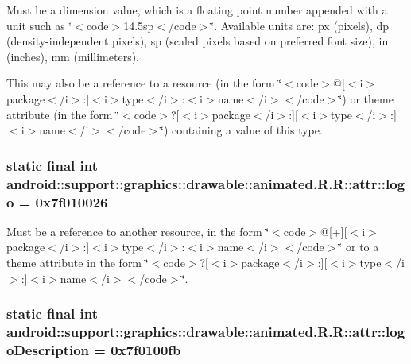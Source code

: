 Must be a dimension value, which is a floating point number appended with a unit such as \char`\"{}$<$code$>$14.5sp$<$/code$>$\char`\"{}. Available units are: px (pixels), dp (density-independent pixels), sp (scaled pixels based on preferred font size), in (inches), mm (millimeters). 

This may also be a reference to a resource (in the form \char`\"{}$<$code$>$@\mbox{[}$<$i$>$package$<$/i$>$:\mbox{]}$<$i$>$type$<$/i$>$:$<$i$>$name$<$/i$>$$<$/code$>$\char`\"{}) or theme attribute (in the form \char`\"{}$<$code$>$?\mbox{[}$<$i$>$package$<$/i$>$:\mbox{]}\mbox{[}$<$i$>$type$<$/i$>$:\mbox{]}$<$i$>$name$<$/i$>$$<$/code$>$\char`\"{}) containing a value of this type. \hypertarget{classandroid_1_1support_1_1graphics_1_1drawable_1_1animated_1_1_r_1_1attr_c8255f8e011683cb6baaf8c1ab0e6345}{
\subsubsection[{logo}]{\setlength{\rightskip}{0pt plus 5cm}static final int android::support::graphics::drawable::animated.R.R::attr::logo = 0x7f010026}}
\label{classandroid_1_1support_1_1graphics_1_1drawable_1_1animated_1_1_r_1_1attr_c8255f8e011683cb6baaf8c1ab0e6345}


Must be a reference to another resource, in the form \char`\"{}$<$code$>$@\mbox{[}+\mbox{]}\mbox{[}$<$i$>$package$<$/i$>$:\mbox{]}$<$i$>$type$<$/i$>$:$<$i$>$name$<$/i$>$$<$/code$>$\char`\"{} or to a theme attribute in the form \char`\"{}$<$code$>$?\mbox{[}$<$i$>$package$<$/i$>$:\mbox{]}\mbox{[}$<$i$>$type$<$/i$>$:\mbox{]}$<$i$>$name$<$/i$>$$<$/code$>$\char`\"{}. \hypertarget{classandroid_1_1support_1_1graphics_1_1drawable_1_1animated_1_1_r_1_1attr_a13f8ec0564df299b893e1c6cf16a340}{
\subsubsection[{logoDescription}]{\setlength{\rightskip}{0pt plus 5cm}static final int android::support::graphics::drawable::animated.R.R::attr::logoDescription = 0x7f0100fb}}
\label{classandroid_1_1support_1_1graphics_1_1drawable_1_1animated_1_1_r_1_1attr_a13f8ec0564df299b893e1c6cf16a340}


